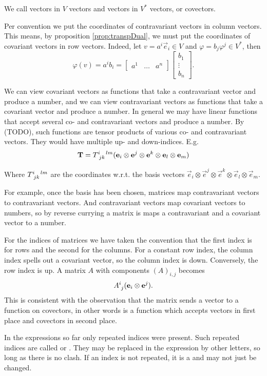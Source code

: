 We call vectors in $V$  vectors and vectors in $V^*$  vectors, or covectors.

Per convention we put the coordinates of contravariant vectors in column vectors. This means, by proposition \ref{prop:transpDual}, we must put the coordinates of covariant vectors in row vectors. Indeed, let $v=a^i \vec{e}_i\in V$ and $\varphi = b_j\varphi^j \in V^*$, then
\[ \varphi(v) = a^ib_i = \begin{bmatrix}
a^1 & \hdots & a^n
\end{bmatrix}\begin{bmatrix}
b_1 \\ \vdots  \\ b_n
\end{bmatrix}. \]

We can view covariant vectors as functions that take a contravariant vector and produce a number, and we can view contravariant vectors as functions that take a covariant vector and produce a number. In general we may have linear functions that accept several co- and contravariant vectors and produce a number. By (TODO), such functions are tensor products of various co- and contravariant vectors. They would have multiple up- and down-indices. E.g.
\[ \vec{T} = \tensor{T}{^i_j_k^l^m}(\vec{e}_i\otimes \vec{e}^j\otimes \vec{e}^k\otimes \vec{e}_l \otimes \vec{e}_m) \]

Where $\tensor{T}{^i_j_k^l^m}$ are the coordinates w.r.t. the basis vectors $\vec{e}_i\otimes \vec{e}^j\otimes \vec{e}^k \otimes\vec{e}_l \otimes \vec{e}_m$.

For example, once the basis has been chosen, matrices map contravariant vectors to contravariant vectors. And contravariant vectors map covariant vectors to numbers, so by reverse currying a matrix is maps a contravariant and a covariant vector to a number.

For the indices of matrices we have taken the convention that the first index is for rows and the second for the columns. For a constant row index, the column index spells out a covariant vector, so the column index is down. Conversely, the row index is up. A matrix $A$ with components $(A)_{i,j}$ becomes
\[ \tensor{A}{^i_j}(\vec{e}_i\otimes \vec{e}^j). \]
This is consistent with the observation that the matrix sends a vector to a function on covectors, in other words is a function which accepts vectors in first place and covectors in second place.

In the expressions so far only repeated indices were present. Such repeated indices are called   or . They may be replaced in the expression by other letters, so long as there is no clash. If an index is not repeated, it is a  and may not just be changed.

